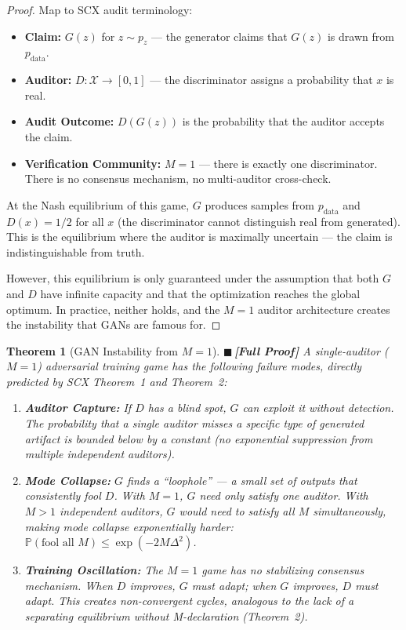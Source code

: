 \documentclass[12pt,a4paper]{article}
\newtheorem{theorem}{Theorem}[section]
\theoremstyle{definition}
\newcommand{\rigorFull}{{\color{rigorcolor}$\blacksquare$\,\textbf{[Full Proof]}}}
\newcommand{\SCX}{\textsc{SCX}}
\newcommand{\Pbb}{\mathbb{P}}
\newcommand{\cX}{\mathcal{X}}
\begin{document}
\begin{proof}
Map to \SCX{} audit terminology:
\begin{itemize}[nosep]
    \item \textbf{Claim:} $G(z)$ for $z \sim p_z$ — the generator claims that $G(z)$ is drawn from $p_{\text{data}}$.
    \item \textbf{Auditor:} $D: \cX \to [0,1]$ — the discriminator assigns a probability that $x$ is real.
    \item \textbf{Audit Outcome:} $D(G(z))$ is the probability that the auditor accepts the claim.
    \item \textbf{Verification Community:} $M=1$ — there is exactly one discriminator. There is no consensus mechanism, no multi-auditor cross-check.
\end{itemize}

At the Nash equilibrium of this game, $G$ produces samples from $p_{\text{data}}$ and $D(x) = 1/2$ for all $x$ (the discriminator cannot distinguish real from generated). This is the equilibrium where the auditor is maximally uncertain — the claim is indistinguishable from truth.

However, this equilibrium is only guaranteed under the assumption that both $G$ and $D$ have infinite capacity and that the optimization reaches the global optimum. In practice, neither holds, and the $M=1$ auditor architecture creates the instability that GANs are famous for.
\end{proof}

\begin{theorem}[GAN Instability from $M=1$]\label{thm:gan_instability}
\rigorFull
A single-auditor ($M=1$) adversarial training game has the following failure modes, directly predicted by \SCX{} Theorem~1 and Theorem~2:

\begin{enumerate}[label=(\roman*)]
    \item \textbf{Auditor Capture:} If $D$ has a blind spot, $G$ can exploit it without detection. The probability that a single auditor misses a specific type of generated artifact is bounded below by a constant (no exponential suppression from multiple independent auditors).
    \item \textbf{Mode Collapse:} $G$ finds a ``loophole'' — a small set of outputs that consistently fool $D$. With $M=1$, $G$ need only satisfy one auditor. With $M>1$ independent auditors, $G$ would need to satisfy all $M$ simultaneously, making mode collapse exponentially harder: $\Pbb(\text{fool all } M) \le \exp(-2M\Delta^2)$.
    \item \textbf{Training Oscillation:} The $M=1$ game has no stabilizing consensus mechanism. When $D$ improves, $G$ must adapt; when $G$ improves, $D$ must adapt. This creates non-convergent cycles, analogous to the lack of a separating equilibrium without M-declaration (Theorem~2).
\end{enumerate}
\end{theorem}
\end{document}
